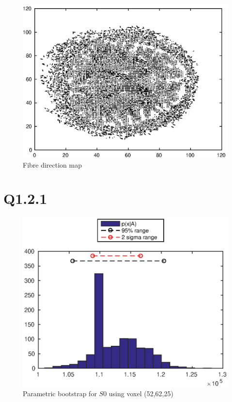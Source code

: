 \documentclass[11pt,a4paper,oneside]{report}
\begin{document}
\begin{figure}[H]
      \centering
    \includegraphics[scale=1]{figures/q1/q114-fbDir.eps}
    \caption{Fibre direction map}
    \label{q114-fbDir}
\end{figure}

\section*{Q1.2.1}

\begin{figure}[H]
      \centering
    \includegraphics[scale=1]{figures/q2/q121-p1.eps}
    \caption{Parametric bootstrap for $S0$ using voxel (52,62,25)}
    \label{q121-p1}
\end{figure}
\end{document}
